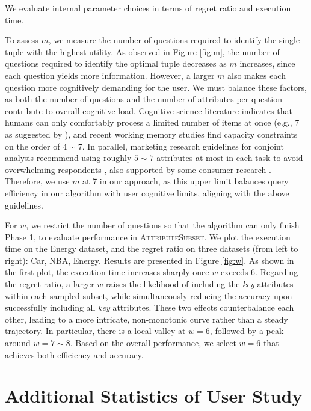 We evaluate internal parameter choices in terms of regret ratio and execution time.

To assess $m$, we measure the number of questions required to identify the single tuple with the highest utility. As observed in Figure \ref{fig:m}, the number of questions required to identify the optimal tuple decreases as $m$ increases, since each question yields more information. However, a larger $m$ also makes each question more cognitively demanding for the user. We must balance these factors, as both the number of questions and the number of attributes per question contribute to overall cognitive load. Cognitive science literature indicates that humans can only comfortably process a limited number of items at once (e.g., $7$ as suggested by \cite{MG56}), and recent working memory studies find capacity constraints on the order of $4\sim 7$\cite{Morra2024}. In parallel, marketing research guidelines for conjoint analysis recommend using roughly $5\sim7$ attributes at most in each task to avoid overwhelming respondents \cite{McCullough2007}, also supported by some consumer research \cite{OA14, GS78}. Therefore, we use $m$ at 7 in our approach, as this upper limit balances query efficiency in our algorithm with user cognitive limits, aligning with the above guidelines.

For $w$, we restrict the number of questions so that the algorithm can only finish Phase 1, to evaluate performance in \textsc{AttributeSubset}. We plot the execution time on the Energy dataset, and the regret ratio on three datasets (from left to right): Car, NBA, Energy. Results are presented in Figure \ref{fig:w}. As shown in the first plot, the execution time increases sharply once $w$ exceeds $6$. Regarding the regret ratio, a larger $w$ raises the likelihood of including the \textit{key} attributes within each sampled subset, while simultaneously reducing the accuracy upon successfully including all \textit{key} attributes. These two effects counterbalance each other, leading to a more intricate, non-monotonic curve rather than a steady trajectory. In particular, there is a local valley at $w=6$, followed by a peak around $w=7\sim 8$. Based on the overall performance, we select $w=6$ that achieves both efficiency and accuracy.

\section{Additional Statistics of User Study}
\label{appen:user_study}

